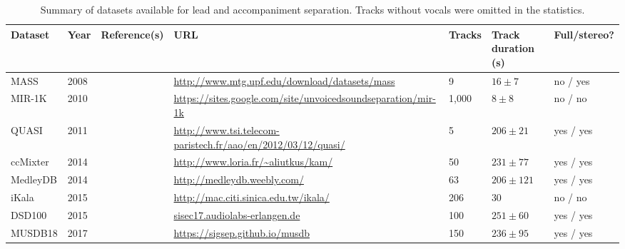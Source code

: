 \begin{table*}[htbp]
	\centering
	\caption{Summary of datasets available for lead and accompaniment separation. Tracks without vocals were omitted in the statistics.}
	\label{tab:datasets}
		\begin{tabular}{|l l l l l l l|}
			\hline
			\textbf{Dataset} & \textbf{Year} & \textbf{Reference(s)} & \textbf{URL} & \textbf{Tracks} & \textbf{Track duration (s)} & \textbf{Full/stereo?}\\
			\hline
			MASS & 2008 & \cite{MTGMASSdb} & \url{http://www.mtg.upf.edu/download/datasets/mass} & 9 & $16 \pm 7$ & no / yes \\
			MIR-1K & 2010 & \cite{hsu10} & \url{https://sites.google.com/site/unvoicedsoundseparation/mir-1k} & 1,000 & $8 \pm 8$ & no / no \\
			QUASI & 2011 & \cite{liutkus11,vincent12} & \url{http://www.tsi.telecom-paristech.fr/aao/en/2012/03/12/quasi/} & 5 & $206 \pm 21$ & yes / yes \\
			ccMixter & 2014 & \cite{liutkus142} & \url{http://www.loria.fr/~aliutkus/kam/} & 50 & $231 \pm 77 $ & yes / yes \\
			MedleyDB & 2014 & \cite{bittner14} & \url{http://medleydb.weebly.com/} & 63 & $206 \pm 121$ & yes / yes \\
			iKala & 2015 & \cite{chan15} & \url{http://mac.citi.sinica.edu.tw/ikala/} & 206 & 30 & no / no \\
			DSD100 & 2015 & \cite{ono15} & \url{sisec17.audiolabs-erlangen.de} & 100 & $251 \pm 60$ & yes / yes \\
      MUSDB18 & 2017 & \cite{rafii17} & \url{https://sigsep.github.io/musdb} & 150 & $236 \pm 95$ & yes / yes \\
			\hline
		\end{tabular}
\end{table*}
